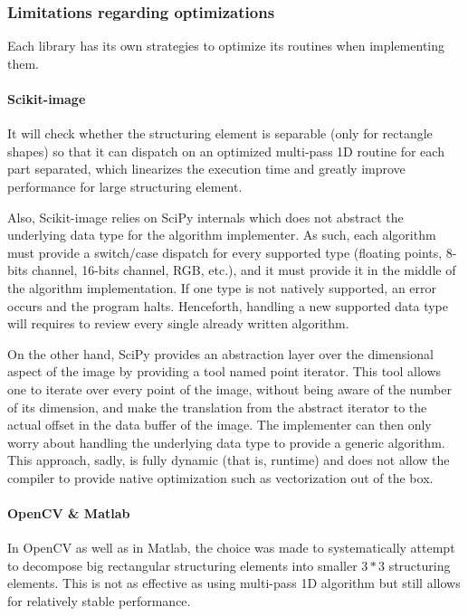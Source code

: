 \subsubsection{Limitations regarding optimizations}

Each library has its own strategies to optimize its routines when implementing them.

\paragraph{Scikit-image} It will check whether the structuring element is separable (only for rectangle shapes) so that
it can dispatch on an optimized multi-pass 1D routine for each part separated, which linearizes the execution time and
greatly improve performance for large structuring element.

Also, Scikit-image relies on SciPy internals which does not abstract the underlying data type for the algorithm
implementer. As such, each algorithm must provide a switch/case dispatch for every supported type (floating points,
8-bits channel, 16-bits channel, RGB, etc.), and it must provide it in the middle of the algorithm implementation. If
one type is not natively supported, an error occurs and the program halts. Henceforth, handling a new supported data
type will requires to review every single already written algorithm.

On the other hand, SciPy provides an abstraction layer over the dimensional aspect of the image by providing a tool
named point iterator. This tool allows one to iterate over every point of the image, without being aware of the number
of its dimension, and make the translation from the abstract iterator to the actual offset in the data buffer of the
image. The implementer can then only worry about handling the underlying data type to provide a generic algorithm. This
approach, sadly, is fully dynamic (that is, runtime) and does not allow the compiler to provide native optimization such
as vectorization out of the box.

\paragraph{OpenCV \& Matlab} In OpenCV as well as in Matlab, the choice was made to systematically attempt to decompose
big rectangular structuring elements into smaller \(3*3\) structuring elements. This is not as effective as using
multi-pass 1D algorithm but still allows for relatively stable performance.

